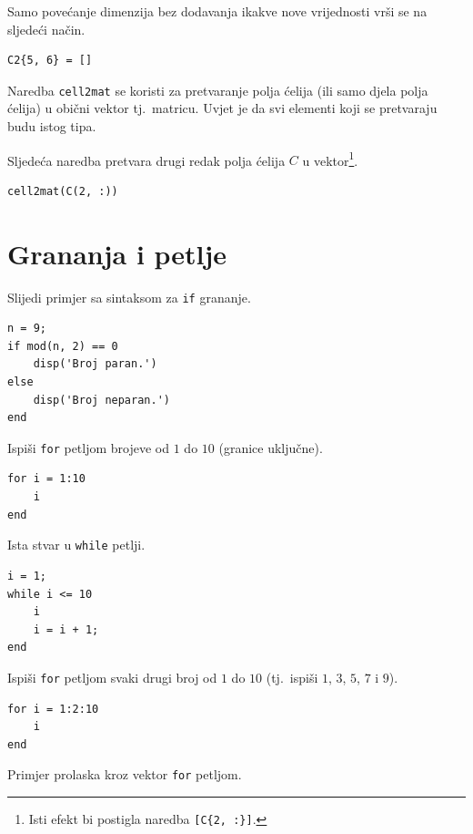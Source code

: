 \documentclass[a4paper, 10pt]{article}
\begin{document}
Samo povećanje dimenzija bez dodavanja ikakve nove vrijednosti vrši se na sljedeći način.

\begin{lstlisting}
C2{5, 6} = []
\end{lstlisting}

Naredba \texttt{cell2mat} se koristi za pretvaranje polja ćelija (ili samo djela polja ćelija) u obični vektor tj.\ matricu.
Uvjet je da svi elementi koji se pretvaraju budu istog tipa.

Sljedeća naredba pretvara drugi redak polja ćelija $C$ u vektor\footnote{Isti efekt bi postigla naredba \texttt{[C\{2, :\}]}.}.

\begin{lstlisting}
cell2mat(C(2, :))
\end{lstlisting}


\section{Grananja i petlje}

Slijedi primjer sa sintaksom za \texttt{if} grananje.

\begin{lstlisting}
n = 9;
if mod(n, 2) == 0
    disp('Broj paran.')
else
    disp('Broj neparan.')
end
\end{lstlisting}

Ispiši \texttt{for} petljom brojeve od $1$ do $10$ (granice uključne).

\begin{lstlisting}
for i = 1:10
    i
end
\end{lstlisting}

Ista stvar u \texttt{while} petlji.

\begin{lstlisting}
i = 1;
while i <= 10
    i
    i = i + 1;
end
\end{lstlisting}

Ispiši \texttt{for} petljom svaki drugi broj od $1$ do $10$ (tj.\ ispiši $1$, $3$, $5$, $7$ i $9$).

\begin{lstlisting}
for i = 1:2:10
    i
end
\end{lstlisting}

Primjer prolaska kroz vektor \texttt{for} petljom.
\end{document}
